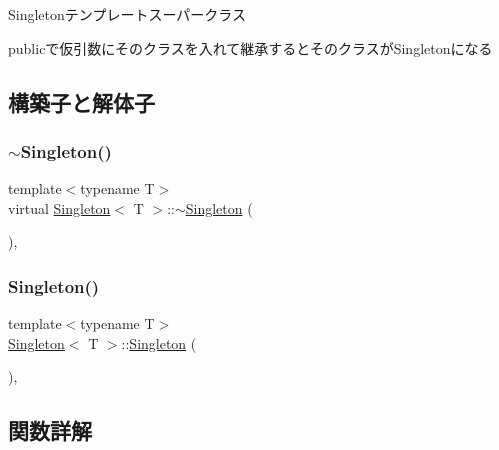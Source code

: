 Singletonテンプレートスーパークラス 

publicで仮引数にそのクラスを入れて継承するとそのクラスが\+Singletonになる 

\subsection{構築子と解体子}
\mbox{\label{class_singleton_ad3c93143836479fb3dd96b21b795938c}} 
\subsubsection{\texorpdfstring{$\sim$\+Singleton()}{~Singleton()}}
{\footnotesize\ttfamily template$<$typename T$>$ \\
virtual \mbox{\hyperlink{class_singleton}{Singleton}}$<$ T $>$\+::$\sim$\mbox{\hyperlink{class_singleton}{Singleton}} (\begin{DoxyParamCaption}{ }\end{DoxyParamCaption})\hspace{0.3cm}{\ttfamily [inline]}, {\ttfamily [virtual]}}

\mbox{\label{class_singleton_a923b995920da9c06590adb170ab2f890}} 
\subsubsection{\texorpdfstring{Singleton()}{Singleton()}}
{\footnotesize\ttfamily template$<$typename T$>$ \\
\mbox{\hyperlink{class_singleton}{Singleton}}$<$ T $>$\+::\mbox{\hyperlink{class_singleton}{Singleton}} (\begin{DoxyParamCaption}{ }\end{DoxyParamCaption})\hspace{0.3cm}{\ttfamily [inline]}, {\ttfamily [protected]}}



\subsection{関数詳解}
\mbox{\label{class_singleton_a57b10e4aa6d89bbac3a16355914655b3}} 
